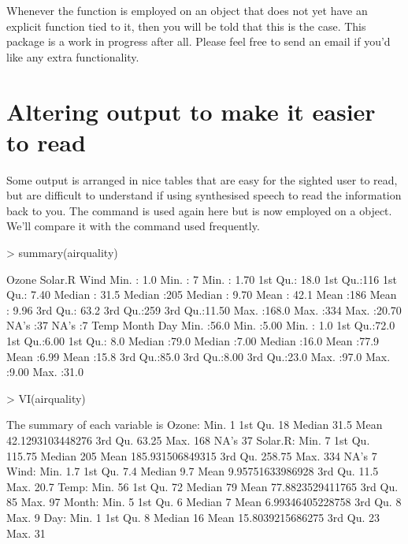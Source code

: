  
Whenever the  function is employed on an object that does not yet have an explicit function tied to it, then you will be told that this is the case. This package is a work in progress after all. Please feel free to send an email if you'd like any extra functionality. 
 
 
 
\section{Altering \R{} output to make it easier to read} 
 
Some \R{} output is arranged in nice tables that are easy for the sighted user to read, but are difficult to understand if using synthesised  speech to read the information back to you. The  command is used again here but is now employed on a  object. We'll compare it with the  command used frequently. 

\begin{Schunk}
\begin{Sinput}
> summary(airquality) 
\end{Sinput}
\begin{Soutput}
     Ozone          Solar.R         Wind      
 Min.   :  1.0   Min.   :  7   Min.   : 1.70  
 1st Qu.: 18.0   1st Qu.:116   1st Qu.: 7.40  
 Median : 31.5   Median :205   Median : 9.70  
 Mean   : 42.1   Mean   :186   Mean   : 9.96  
 3rd Qu.: 63.2   3rd Qu.:259   3rd Qu.:11.50  
 Max.   :168.0   Max.   :334   Max.   :20.70  
 NA's   :37      NA's   :7                    
      Temp          Month           Day      
 Min.   :56.0   Min.   :5.00   Min.   : 1.0  
 1st Qu.:72.0   1st Qu.:6.00   1st Qu.: 8.0  
 Median :79.0   Median :7.00   Median :16.0  
 Mean   :77.9   Mean   :6.99   Mean   :15.8  
 3rd Qu.:85.0   3rd Qu.:8.00   3rd Qu.:23.0  
 Max.   :97.0   Max.   :9.00   Max.   :31.0  
                                             
\end{Soutput}
\begin{Sinput}
> VI(airquality) 
\end{Sinput}
\begin{Soutput}

The summary of each variable is
Ozone: Min. 1   1st Qu. 18   Median 31.5   Mean 42.1293103448276   3rd Qu. 63.25   Max. 168   NA's 37  
Solar.R: Min. 7   1st Qu. 115.75   Median 205   Mean 185.931506849315   3rd Qu. 258.75   Max. 334   NA's 7  
Wind: Min. 1.7   1st Qu. 7.4   Median 9.7   Mean 9.95751633986928   3rd Qu. 11.5   Max. 20.7  
Temp: Min. 56   1st Qu. 72   Median 79   Mean 77.8823529411765   3rd Qu. 85   Max. 97  
Month: Min. 5   1st Qu. 6   Median 7   Mean 6.99346405228758   3rd Qu. 8   Max. 9  
Day: Min. 1   1st Qu. 8   Median 16   Mean 15.8039215686275   3rd Qu. 23   Max. 31  
\end{Soutput}
\end{Schunk}

